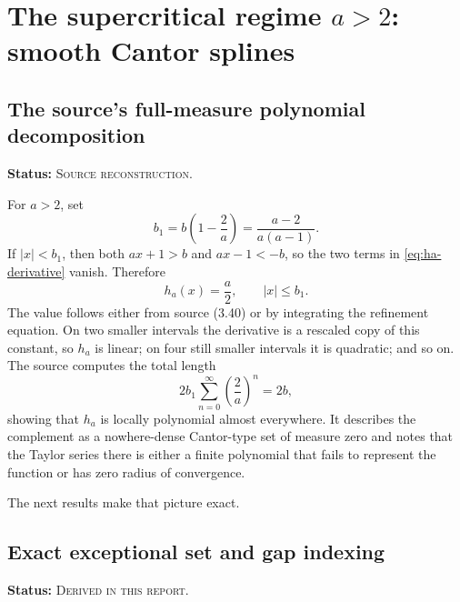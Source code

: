 \documentclass[11pt]{article}
\theoremstyle{definition}
\theoremstyle{remark}
\newcommand{\SourceStatus}{\textcolor{SourceBlue}{\textsc{Source reconstruction}}}
\newcommand{\DerivedStatus}{\textcolor{DerivedPurple}{\textsc{Derived in this report}}}
\newcommand{\status}[1]{\par\smallskip\noindent\textbf{Status:} #1.\par\smallskip}
\begin{document}
\section{The supercritical regime \texorpdfstring{\(a>2\)}{a>2}: smooth Cantor splines}
\label{sec:supercritical}

\subsection{The source's full-measure polynomial decomposition}
\status{\SourceStatus}

For \(a>2\), set
\begin{equation}
  b_1=b\left(1-\frac2a\right)
      =\frac{a-2}{a(a-1)}.
  \label{eq:b1}
\end{equation}
If \(|x|<b_1\), then both \(ax+1>b\) and \(ax-1<-b\), so the two terms in \eqref{eq:ha-derivative} vanish.  Therefore
\begin{equation}
  h_a(x)=\frac a2,
  \qquad |x|\le b_1.
  \label{eq:central-plateau}
\end{equation}
The value follows either from source (3.40) or by integrating the refinement equation.  On two smaller intervals the derivative is a rescaled copy of this constant, so \(h_a\) is linear; on four still smaller intervals it is quadratic; and so on.  The source computes the total length
\begin{equation}
  2b_1\sum_{n=0}^{\infty}\left(\frac2a\right)^n=2b,
  \label{eq:full-measure-polynomial}
\end{equation}
showing that \(h_a\) is locally polynomial almost everywhere.  It describes the complement as a nowhere-dense Cantor-type set of measure zero and notes that the Taylor series there is either a finite polynomial that fails to represent the function or has zero radius of convergence.

The next results make that picture exact.

\subsection{Exact exceptional set and gap indexing}
\status{\DerivedStatus}
\end{document}
